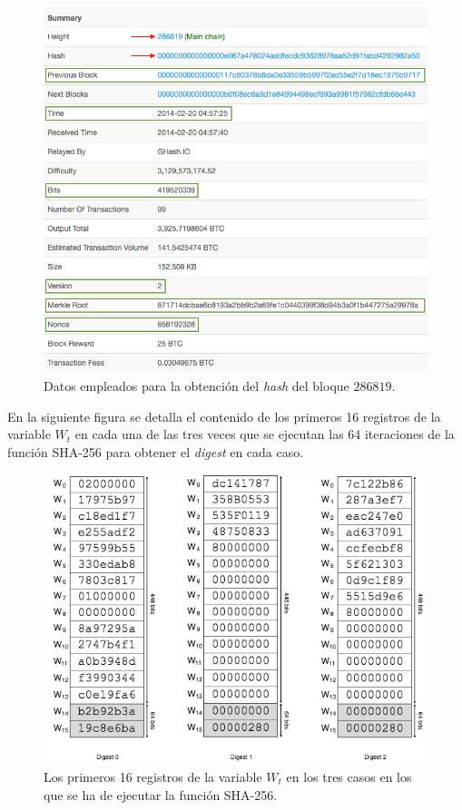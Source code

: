 \documentclass{article}
\begin{document}
    \begin{figure}[H]
    \centering
        \includegraphics[scale=0.47]{img/Bitcoin_block_SHA_256_Block_Data}
        \caption{Datos empleados para la obtención del \textit{hash} del bloque $286819$.}
    \end{figure}
    
    \vspace{3mm}
    En la siguiente figura se detalla el contenido de los primeros 16 registros de la variable $W_{t}$ en cada una de las tres veces que se ejecutan las 64 iteraciones de la función SHA-256 para obtener el \textit{digest} en cada caso.
    \begin{figure}[H]
    \centering
        \includegraphics[scale=0.59]{img/Bitcoin_block_SHA_256_W0_W15_x3}
        \caption{Los primeros 16 registros de la variable $W_{t}$ en los tres casos en los que se ha de ejecutar la función SHA-256.}
    \end{figure}
\end{document}
